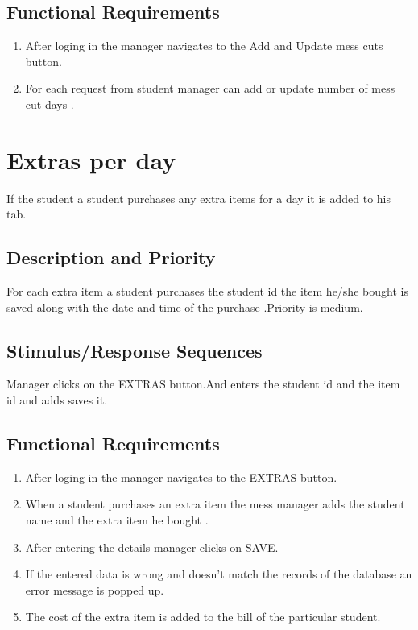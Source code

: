 \documentclass{scrreprt}
\begin{document}
\subsection{Functional Requirements}
\begin{enumerate}
\item After loging in the manager navigates to the Add and Update mess cuts  button.
\item For each request from student manager can add or update number of mess cut days .
\end{enumerate}

\section{Extras per day}
If the student a student purchases any extra items for a day it is added to his tab.


\subsection{Description and Priority}
For each extra item a student purchases the student id the item he/she bought is saved along with the date and time of the purchase .Priority is medium.

\subsection{Stimulus/Response Sequences}
Manager clicks on the EXTRAS button.And enters the student id and the item id and adds saves it.

\subsection{Functional Requirements}
\begin{enumerate}
\item After loging in the manager navigates to the EXTRAS  button.
\item When a student purchases an extra item the mess manager adds the student name and the extra item he bought .
\item After entering the details manager clicks on SAVE.
\item If the entered data is wrong and doesn't match the records of the database an error message is popped up. 
\item The cost of the extra item is added to the bill of the particular student. 
\end{enumerate}
\end{document}
